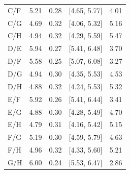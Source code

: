 \documentclass[12pt]{scrartcl}
\begin{document}
\begin{longtable}{lSScS}
   C/F   & 5.21   & 0.28   & [4.65, 5.77]   & 4.01   \\*
   C/G   & 4.69   & 0.32   & [4.06, 5.32]   & 5.16   \\*
   C/H   & 4.94   & 0.32   & [4.29, 5.59]   & 5.47   \\
   \midrule
   D/E   & 5.94   & 0.27   & [5.41, 6.48]   & 3.70   \\*
   D/F   & 5.58   & 0.25   & [5.07, 6.08]   & 3.27   \\*
   D/G   & 4.94   & 0.30   & [4.35, 5.53]   & 4.53   \\*
   D/H   & 4.88   & 0.32   & [4.24, 5.53]   & 5.32   \\
   \midrule
   E/F   & 5.92   & 0.26   & [5.41, 6.44]   & 3.41   \\*
   E/G   & 4.88   & 0.30   & [4.28, 5.49]   & 4.70   \\*
   E/H   & 4.79   & 0.31   & [4.16, 5.42]   & 5.15   \\
   \midrule
   F/G   & 5.19   & 0.30   & [4.59, 5.79]   & 4.63   \\*
   F/H   & 4.96   & 0.32   & [4.33, 5.60]   & 5.21   \\
   \midrule
   G/H   & 6.00   & 0.24   & [5.53, 6.47]   & 2.86   \\
\end{longtable}

\def\sym#1{\ifmmode^{#1}\else\(^{#1}\)\fi}
\end{document}
